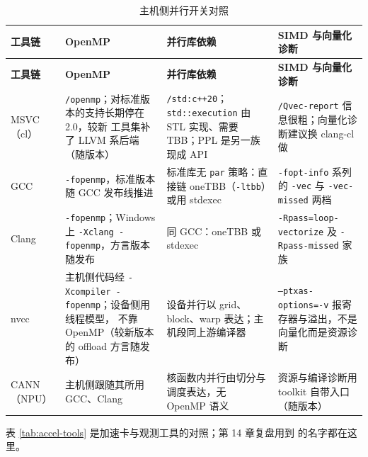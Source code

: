 \documentclass[12pt,a4paper,fontset=fandol]{ctexbook}
\newcommand{\Tp}[1]{\texttt{#1}}
\newcommand{\Bk}{\allowbreak}
\begin{document}
\begin{longtable}{@{}>{\raggedright\arraybackslash}p{}
  >{\raggedright\arraybackslash}p{}
  >{\raggedright\arraybackslash}p{}
  >{\raggedright\arraybackslash}p{}@{}}
\caption{主机侧并行开关对照}\label{tab:host-switches}\\
\toprule
\textbf{工具链} & \textbf{OpenMP} & \textbf{并行库依赖} &
\textbf{SIMD 与向量化诊断} \\
\midrule
\endfirsthead
\toprule
\textbf{工具链} & \textbf{OpenMP} & \textbf{并行库依赖} &
\textbf{SIMD 与向量化诊断} \\
\midrule
\endhead
\bottomrule
\endfoot
MSVC（cl） & \Tp{/openmp}；对标准版本的支持长期停在 2.0，较新
工具集补了 LLVM 系后端（随版本） & \Tp{/std:c++20}；\Tp{std::execution}
由 STL 实现、需要 TBB；PPL 是另一族现成 API & \Tp{/Qvec-report}
信息很粗；向量化诊断建议换 clang-cl 做 \\
GCC & \Tp{-fopenmp}，标准版本随 GCC 发布线推进 & 标准库无
\Tp{par} 策略：直接链 oneTBB（\Tp{-ltbb}）或用 stdexec &
\Tp{-fopt-info} 系列的 \Tp{-vec} 与 \Tp{-vec-missed} 两档 \\
Clang & \Tp{-fopenmp}；Windows 上 \Tp{-Xclang -fopenmp}，方言版本
随发布 & 同 GCC：oneTBB 或 stdexec &
\Tp{-Rpass=loop-\Bk vectorize} 及 \Tp{-Rpass-missed} 家族 \\
nvcc & 主机侧代码经 \Tp{-Xcompiler -fopenmp}；设备侧用线程模型，
不靠 OpenMP（较新版本的 offload 方言随发布） & 设备并行以
grid、block、warp 表达；主机段同上游编译器 &
\Tp{--ptxas-\Bk options=-v} 报寄存器与溢出，不是向量化而是资源诊断 \\
CANN（NPU） & 主机侧跟随其所用 GCC、Clang & 核函数内并行由切分与
调度表达，无 OpenMP 语义 & 资源与编译诊断用 toolkit 自带入口（随版本） \\
\end{longtable}

表 \ref{tab:accel-tools} 是加速卡与观测工具的对照；第 14 章复盘用到
的名字都在这里。
\end{document}
